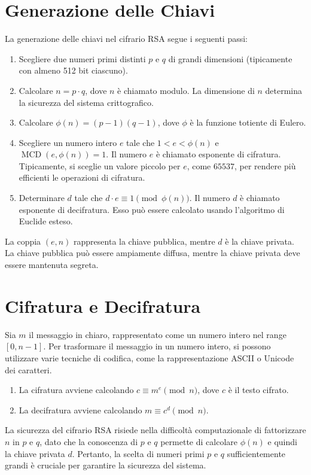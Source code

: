 \documentclass[a4paper,12pt]{report}
\begin{document}
\section{Generazione delle Chiavi}
La generazione delle chiavi nel cifrario RSA segue i seguenti passi:

\begin{enumerate}
    \item Scegliere due numeri primi distinti $p$ e $q$ di grandi dimensioni (tipicamente con almeno 512 bit ciascuno).
    \item Calcolare $n = p \cdot q$, dove $n$ è chiamato modulo. La dimensione di $n$ determina la sicurezza del sistema crittografico.
    \item Calcolare $\phi(n) = (p - 1)(q - 1)$, dove $\phi$ è la funzione totiente di Eulero.
    \item Scegliere un numero intero $e$ tale che $1 < e < \phi(n)$ e $\operatorname{MCD}(e, \phi(n)) = 1$. Il numero $e$ è chiamato esponente di cifratura. Tipicamente, si sceglie un valore piccolo per $e$, come $65537$, per rendere più efficienti le operazioni di cifratura.
    \item Determinare $d$ tale che $d \cdot e \equiv 1 \pmod{\phi(n)}$. Il numero $d$ è chiamato esponente di decifratura. Esso può essere calcolato usando l'algoritmo di Euclide esteso.
\end{enumerate}

La coppia $(e, n)$ rappresenta la chiave pubblica, mentre $d$ è la chiave privata. La chiave pubblica può essere ampiamente diffusa, mentre la chiave privata deve essere mantenuta segreta.

\section{Cifratura e Decifratura}
Sia $m$ il messaggio in chiaro, rappresentato come un numero intero nel range $[0, n - 1]$. Per trasformare il messaggio in un numero intero, si possono utilizzare varie tecniche di codifica, come la rappresentazione ASCII o Unicode dei caratteri.

\begin{enumerate}
    \item La cifratura avviene calcolando $c \equiv m^e \pmod{n}$, dove $c$ è il testo cifrato.
    \item La decifratura avviene calcolando $m \equiv c^d \pmod{n}$.
\end{enumerate}

La sicurezza del cifrario RSA risiede nella difficoltà computazionale di fattorizzare $n$ in $p$ e $q$, dato che la conoscenza di $p$ e $q$ permette di calcolare $\phi(n)$ e quindi la chiave privata $d$. Pertanto, la scelta di numeri primi $p$ e $q$ sufficientemente grandi è cruciale per garantire la sicurezza del sistema.
\end{document}
